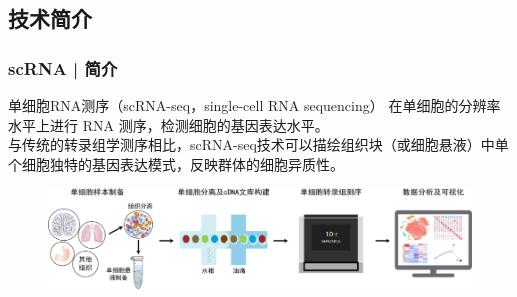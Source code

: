 \documentclass[11pt]{ctexbeamer}
\begin{document}
\subsection{技术简介}
\begin{frame}
  \frametitle{scRNA | 简介}
  \begin{block}{单细胞RNA测序（scRNA-seq，single-cell RNA sequencing）}
  在\alert{单细胞的分辨率水平}上进行 RNA 测序，检测细胞的基因表达水平。\\
  与传统的转录组学测序相比，scRNA-seq技术可以描绘组织块（或细胞悬液）中单个细胞独特的基因表达模式，反映群体的\alert{细胞异质性}。
  \end{block}
     \begin{figure}
    \centering
    \includegraphics[width=\textwidth]{scRNA_intro_01.png}
  \end{figure}
\end{frame}
\end{document}
